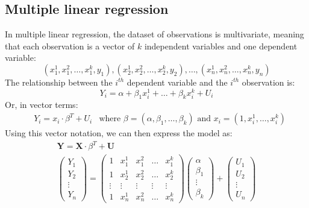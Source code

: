 \subsection{Multiple linear regression}
In multiple linear regression, the dataset of observations is multivariate, meaning that each observation is a vector of $k$ independent variables and one dependent variable:
\begin{equation*}
    (x_1^1, x_1^2, \ldots, x_1^k, y_1), (x_2^1, x_2^2, \ldots, x_2^k, y_2), \ldots, (x_n^1, x_n^2, \ldots, x_n^k, y_n)
\end{equation*}   
The relationship between the $i^{th}$ dependent variable and the $i^{th}$ observation is:
\begin{equation*}
    Y_i = \alpha + \beta_1 x_i^1 + \ldots + \beta_k x_i^k + U_i
\end{equation*}   
Or, in vector terms:
\begin{align*}
    &Y_i = x_i \cdot \beta^T + U_i &\text{where } \beta = (\alpha, \beta_1, \ldots, \beta_k) \text{ and } x_i = (1, x_i^1, \ldots, x_i^k)
\end{align*}
Using this vector notation, we can then express the model as:
\begin{gather*}
    \mathbf{Y} = \mathbf{X} \cdot \beta^T + \mathbf{U} \\
    \begin{pmatrix}
        Y_1 \\
        Y_2 \\
        \vdots \\
        Y_n
    \end{pmatrix} =
    \begin{pmatrix}
        1 & x_1^1 & x_1^2 & \dots & x_1^k \\
        1 & x_2^1 & x_2^2 & \dots & x_2^k \\
        \vdots & \vdots & \vdots & \vdots & \vdots \\
        1 & x_n^1 & x_n^2 & \dots & x_n^k
    \end{pmatrix}
    \begin{pmatrix}
        \alpha \\
        \beta_1 \\
        \vdots \\
        \beta_k
    \end{pmatrix} +
    \begin{pmatrix}
        U_1 \\
        U_2 \\
        \vdots \\
        U_n
    \end{pmatrix}
\end{gather*}
